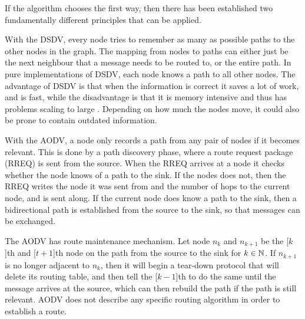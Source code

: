 \documentclass[letter, 12pt, english, draft]{article}
\begin{document}
If the algorithm chooses the first way, then there has been established two fundamentally different principles that can be applied.
\begin{description}
{With the DSDV, every node tries to remember as many as possible paths to the other nodes in the graph. The mapping from nodes to paths can either just be the next neighbour that a message needs to be routed to, or the entire path. In pure implementations of DSDV, each node knows a path to all other nodes. The advantage of DSDV is that when the information is correct it saves a lot of work, and is fast, while the disadvantage is that it is memory intensive and thus has problems scaling to large \manet. Depending on how much the nodes move, it could also be prone to contain outdated information.
}
{\cite{DSDV}}

{With the AODV, a node only records a path from any pair of nodes if it becomes relevant. This is done by a path discovery phase, where a route request package (RREQ) is sent from the source. When the RREQ arrives at a node it checks whether the node knows of a path to the sink. If the nodes does not, then the RREQ writes the node it was sent from and the number of hops to the current node, and is sent along. If the current node does know a path to the sink, then a bidirectional path is established from the source to the sink, so that messages can be exchanged.

The AODV has route maintenance mechanism. Let node $n_k$ and $n_{k+1}$ be the [$k$]th and [$t+1$]th node on the path from the source to the sink for $k \in \mathbb{N}$. If $n_{k+1}$ is no longer adjacent to $n_{k}$, then it will begin a tear-down protocol that will delete its routing table, and then tell the [$k-1$]th to do the same until the message arrives at the source, which can then rebuild the path if the path is still relevant.
AODV does not describe any specific routing algorithm in order to establish a route.}
{\cite{larMotion, AODV}}

\end{description}
\end{document}
